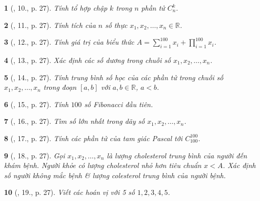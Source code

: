 \documentclass{article}
\newtheorem{baitoan}{}
\begin{document}
\begin{baitoan}[\cite{Doanh_Tuan_Pascal}, 10., p. 27]
	Tính tổ hợp chập $k$ trong $n$ phần tử $C_n^k$.
\end{baitoan}

\begin{baitoan}[\cite{Doanh_Tuan_Pascal}, 11., p. 27]
	Tính tích của $n$ số thực $x_1,x_2,\ldots,x_n\in\mathbb{R}$.
\end{baitoan}

\begin{baitoan}[\cite{Doanh_Tuan_Pascal}, 12., p. 27]
	Tính giá trị của biểu thức $A = \sum_{i=1}^{100} x_i + \prod_{i=1}^{100} x_i$.
\end{baitoan}

\begin{baitoan}[\cite{Doanh_Tuan_Pascal}, 13., p. 27]
	Xác định các số dương trong chuỗi số $x_1,x_2,\ldots,x_n$.
\end{baitoan}

\begin{baitoan}[\cite{Doanh_Tuan_Pascal}, 14., p. 27]
	Tính trung bình số học của các phần tử trong chuỗi số $x_1,x_2,\ldots,x_n$ trong đoạn $[a,b]$ với $a,b\in\mathbb{R}$, $a < b$.
\end{baitoan}

\begin{baitoan}[\cite{Doanh_Tuan_Pascal}, 15., p. 27]
	Tính $100$ số Fibonacci đầu tiên.
\end{baitoan}

\begin{baitoan}[\cite{Doanh_Tuan_Pascal}, 16., p. 27]
	Tìm số lớn nhất trong dãy số $x_1,x_2,\ldots,x_n$.
\end{baitoan}

\begin{baitoan}[\cite{Doanh_Tuan_Pascal}, 17., p. 27]
	Tính các phần tử của tam giác Pascal tới $C_{100}^{100}$.
\end{baitoan}

\begin{baitoan}[\cite{Doanh_Tuan_Pascal}, 18., p. 27]
	Gọi $x_1,x_2,\ldots,x_n$ là lượng cholesterol trung bình của người đến khám bệnh. Người khỏe có lượng cholesterol nhỏ hơn tiêu chuẩn $x < A$. Xác định số người không mắc bệnh \& lượng colesterol trung bình của người bệnh.
\end{baitoan}

\begin{baitoan}[\cite{Doanh_Tuan_Pascal}, 19., p. 27]
	Viết các hoán vị với 5 số $1,2,3,4,5$.
\end{baitoan}
\end{document}
